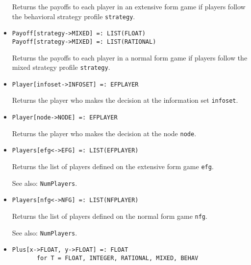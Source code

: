 \begin{itemize}
\bd
Returns the payoffs to each player in an extensive form game
if players follow the behavioral strategy profile \verb+strategy+.
\ed

\item
\protect \large \begin{verbatim}
Payoff[strategy->MIXED] =: LIST(FLOAT)
Payoff[strategy->MIXED] =: LIST(RATIONAL)
\end{verbatim}\normalsize

\bd
Returns the payoffs to each player in a normal form game
if players follow the mixed strategy profile \verb+strategy+.
\ed

\item
\protect \large \begin{verbatim}
Player[infoset->INFOSET] =: EFPLAYER
\end{verbatim}\normalsize

\bd
Returns the player who makes the decision at the information
set \verb+infoset+.
\ed

\item
\protect \large \begin{verbatim}
Player[node->NODE] =: EFPLAYER
\end{verbatim}\normalsize

\bd
Returns the player who makes the decision at the node
\verb+node+.
\ed

\item
\protect \large \begin{verbatim}
Players[efg<->EFG] =: LIST(EFPLAYER)
\end{verbatim} \normalsize

\bd
Returns the list of players defined on the extensive form
game \verb+efg+.
\item
[See also:] {\tt NumPlayers}.
\ed

\item
\protect \large \begin{verbatim}
Players[nfg<->NFG] =: LIST(NFPLAYER)
\end{verbatim} \normalsize

\bd
Returns the list of players defined on the normal form
game \verb+nfg+.
\item
[See also:] {\tt NumPlayers}.
\ed

\item 
\protect \large \begin{verbatim}
Plus[x->FLOAT, y->FLOAT] =: FLOAT
       for T = FLOAT, INTEGER, RATIONAL, MIXED, BEHAV
\end{verbatim} \normalsize


\end{itemize}
